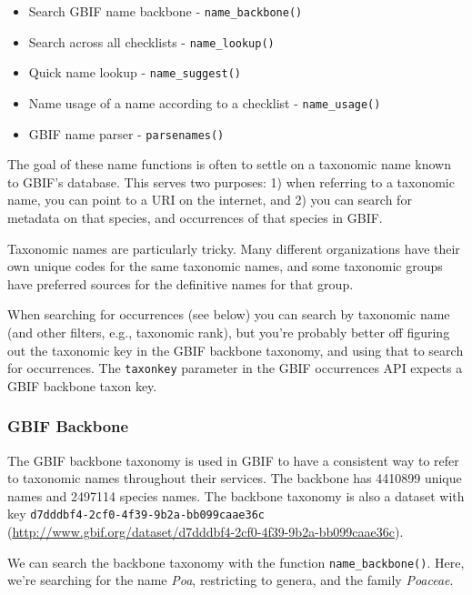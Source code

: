 \documentclass[author-year, review, 11pt]{components/elsarticle} %
\newenvironment{Shaded}{\begin{snugshade}}{\end{snugshade}}
\newcommand{\KeywordTok}[1]{\textcolor[rgb]{0.13,0.29,0.53}{\textbf{{#1}}}}
\newcommand{\DataTypeTok}[1]{\textcolor[rgb]{0.13,0.29,0.53}{{#1}}}
\newcommand{\StringTok}[1]{\textcolor[rgb]{0.31,0.60,0.02}{{#1}}}
\newcommand{\CommentTok}[1]{\textcolor[rgb]{0.56,0.35,0.01}{\textit{{#1}}}}
\newcommand{\NormalTok}[1]{{#1}}
\begin{document}
\begin{itemize}
\itemsep1pt\parskip0pt
\item
  Search GBIF name backbone - \texttt{name\_backbone()}
\item
  Search across all checklists - \texttt{name\_lookup()}
\item
  Quick name lookup - \texttt{name\_suggest()}
\item
  Name usage of a name according to a checklist - \texttt{name\_usage()}
\item
  GBIF name parser - \texttt{parsenames()}
\end{itemize}

The goal of these name functions is often to settle on a taxonomic name
known to GBIF's database. This serves two purposes: 1) when referring to
a taxonomic name, you can point to a URI on the internet, and 2) you can
search for metadata on that species, and occurrences of that species in
GBIF.

Taxonomic names are particularly tricky. Many different organizations
have their own unique codes for the same taxonomic names, and some
taxonomic groups have preferred sources for the definitive names for
that group.

When searching for occurrences (see below) you can search by taxonomic
name (and other filters, e.g., taxonomic rank), but you're probably
better off figuring out the taxonomic key in the GBIF backbone taxonomy,
and using that to search for occurrences. The \texttt{taxonkey}
parameter in the GBIF occurrences API expects a GBIF backbone taxon key.

\subsubsection{GBIF Backbone}\label{gbif-backbone}

The GBIF backbone taxonomy is used in GBIF to have a consistent way to
refer to taxonomic names throughout their services. The backbone has
4410899 unique names and 2497114 species names. The backbone taxonomy is
also a dataset with key \texttt{d7dddbf4-2cf0-4f39-9b2a-bb099caae36c}
(\url{http://www.gbif.org/dataset/d7dddbf4-2cf0-4f39-9b2a-bb099caae36c}).

We can search the backbone taxonomy with the function
\texttt{name\_backbone()}. Here, we're searching for the name
\emph{Poa}, restricting to genera, and the family \emph{Poaceae}.

\begin{Shaded}
\end{Shaded}
\end{document}
